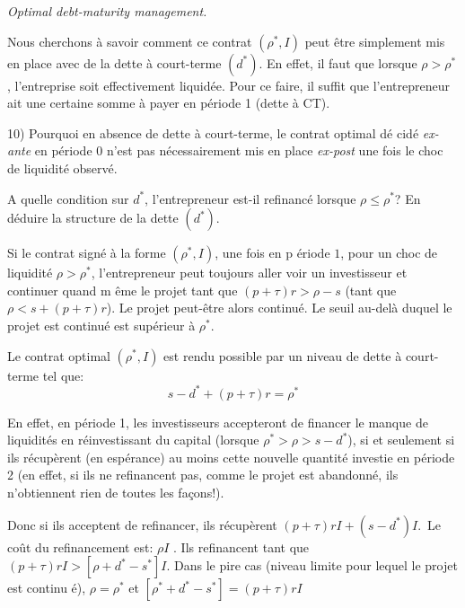 \documentclass[a4paper]{article}
\begin{document}
\bigskip

\textit{Optimal debt-maturity management.}

\bigskip

Nous cherchons \`{a} savoir comment ce contrat $\left( \rho ^{\ast
},I\right) $ peut \^{e}tre simplement mis en place avec de la dette \`{a}
court-terme $(d^{\ast })$. En effet, il faut que lorsque $\rho >\rho ^{\ast
} $, l'entreprise soit effectivement liquid\'{e}e. Pour ce faire, il suffit
que l'entrepreneur ait une certaine somme \`{a} payer en p\'{e}riode 1
(dette \`{a} CT).

\bigskip

10) Pourquoi en absence de dette \`{a} court-terme, le contrat optimal d\'{e}%
cid\'{e} \textit{ex-ante} en p\'{e}riode $0$ n'est pas n\'{e}cessairement
mis en place \textit{ex-post }une fois le choc de liquidit\'{e} observ\'{e}.

A quelle condition sur $d^{\ast }$, l'entrepreneur est-il refinanc\'{e}
lorsque $\rho \leq \rho ^{\ast }$? En d\'{e}duire la structure de la dette $%
(d^{\ast })$.

\bigskip

Si le contrat sign\'{e} \`{a} la forme $(\rho ^{\ast },I)$, une fois en p%
\'{e}riode $1$, pour un choc de liquidit\'{e} $\rho >\rho ^{\ast }$,
l'entrepreneur peut toujours aller voir un investisseur et continuer quand m%
\^{e}me le projet tant que $(p+\tau )r>\rho -s$ (tant que $\rho <s+(p+\tau
)r $). Le projet peut-\^{e}tre alors continu\'{e}. Le seuil au-del\`{a}
duquel le projet est continu\'{e} est sup\'{e}rieur \`{a} $\rho ^{\ast }$.

Le contrat optimal $\left( \rho ^{\ast },I\right) $ est rendu possible par
un niveau de dette \`{a} court-terme tel que:%
\begin{equation*}
s-d^{\ast }+(p+\tau )r=\rho ^{\ast }
\end{equation*}

En effet, en p\'{e}riode 1, les investisseurs accepteront de financer le
manque de liquidit\'{e}s en r\'{e}investissant du capital (lorsque $\rho
^{\ast }>\rho >s-d^{\ast }$), si et seulement si ils r\'{e}cup\`{e}rent (en
esp\'{e}rance) au moins cette nouvelle quantit\'{e} investie en p\'{e}riode
2 (en effet, si ils ne refinancent pas, comme le projet est abandonn\'{e},
ils n'obtiennent rien de toutes les fa\c{c}ons!).

Donc si ils acceptent de refinancer, ils r\'{e}cup\`{e}rent $(p+\tau
)rI+\left( s-d^{\ast }\right) I$.\ Le co\^{u}t du refinancement est: $\rho I$%
. Ils refinancent tant que $(p+\tau )rI>\left[ \rho +d^{\ast }-s^{\ast }%
\right] I$. Dans le pire cas (niveau limite pour lequel le projet est continu%
\'{e}), $\rho =\rho ^{\ast }$ et $\left[ \rho ^{\ast }+d^{\ast }-s^{\ast }%
\right] =(p+\tau )rI$
\end{document}
